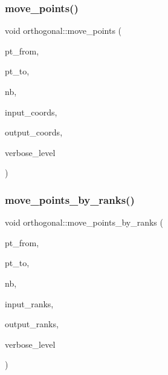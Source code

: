 \subsubsection{\texorpdfstring{move\+\_\+points()}{move\_points()}}
{\footnotesize\ttfamily void orthogonal\+::move\+\_\+points (\begin{DoxyParamCaption}\item[{\mbox{\hyperlink{galois_8h_a09fddde158a3a20bd2dcadb609de11dc}{I\+NT}}}]{pt\+\_\+from,  }\item[{\mbox{\hyperlink{galois_8h_a09fddde158a3a20bd2dcadb609de11dc}{I\+NT}}}]{pt\+\_\+to,  }\item[{\mbox{\hyperlink{galois_8h_a09fddde158a3a20bd2dcadb609de11dc}{I\+NT}}}]{nb,  }\item[{\mbox{\hyperlink{galois_8h_a09fddde158a3a20bd2dcadb609de11dc}{I\+NT}} $\ast$}]{input\+\_\+coords,  }\item[{\mbox{\hyperlink{galois_8h_a09fddde158a3a20bd2dcadb609de11dc}{I\+NT}} $\ast$}]{output\+\_\+coords,  }\item[{\mbox{\hyperlink{galois_8h_a09fddde158a3a20bd2dcadb609de11dc}{I\+NT}}}]{verbose\+\_\+level }\end{DoxyParamCaption})}

\mbox{\label{classorthogonal_a6b1b57c7b6114d7d51c9375fe5014b22}} 
\subsubsection{\texorpdfstring{move\+\_\+points\+\_\+by\+\_\+ranks()}{move\_points\_by\_ranks()}}
{\footnotesize\ttfamily void orthogonal\+::move\+\_\+points\+\_\+by\+\_\+ranks (\begin{DoxyParamCaption}\item[{\mbox{\hyperlink{galois_8h_a09fddde158a3a20bd2dcadb609de11dc}{I\+NT}}}]{pt\+\_\+from,  }\item[{\mbox{\hyperlink{galois_8h_a09fddde158a3a20bd2dcadb609de11dc}{I\+NT}}}]{pt\+\_\+to,  }\item[{\mbox{\hyperlink{galois_8h_a09fddde158a3a20bd2dcadb609de11dc}{I\+NT}}}]{nb,  }\item[{\mbox{\hyperlink{galois_8h_a09fddde158a3a20bd2dcadb609de11dc}{I\+NT}} $\ast$}]{input\+\_\+ranks,  }\item[{\mbox{\hyperlink{galois_8h_a09fddde158a3a20bd2dcadb609de11dc}{I\+NT}} $\ast$}]{output\+\_\+ranks,  }\item[{\mbox{\hyperlink{galois_8h_a09fddde158a3a20bd2dcadb609de11dc}{I\+NT}}}]{verbose\+\_\+level }\end{DoxyParamCaption})}

